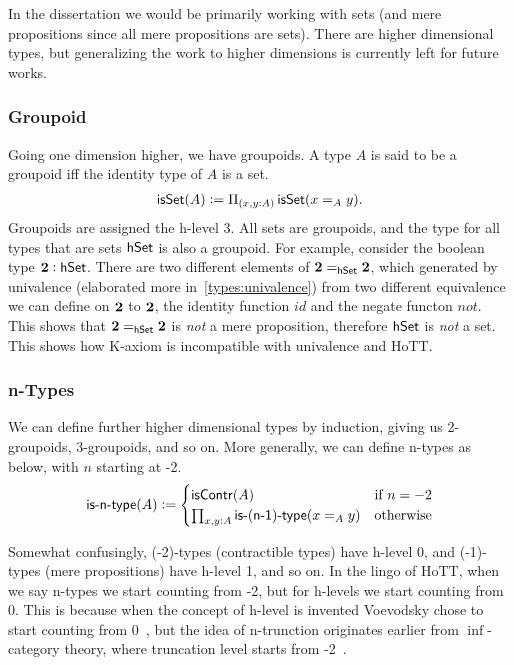 In the dissertation we would be primarily working with sets
(and mere propositions since all mere propositions are sets).
There are higher dimensional types, but generalizing the work to
higher dimensions is currently left for future works.

\subsubsection{Groupoid}
Going one dimension higher, we have groupoids. A type $A$ is said to be a
groupoid iff the identity type of $A$ is a set.
\begin{align*}
    \operatorname{\mathsf{isSet}}(A) := \Pi_{(x,y : A)}\operatorname{\mathsf{isSet}}(x =_A y).
\end{align*}
Groupoids are assigned the h-level 3. All sets are groupoids,
and the type for all types that are sets $\mathsf{hSet}$ is also a groupoid.
For example, consider the boolean type ${\mathbf{2}} : \mathsf{hSet}$. There are two
different elements of ${\mathbf{2}} =_{\mathsf{hSet}} {\mathbf{2}}$, which generated by
univalence (elaborated more in~\cref{types:univalence}) from two
different equivalence we can define on ${\mathbf{2}}$ to ${\mathbf{2}}$, the
identity function $id$ and the negate functon $not$.
This shows that ${\mathbf{2}} =_{\mathsf{hSet}} {\mathbf{2}}$ is \emph{not} a mere proposition,
therefore $\mathsf{hSet}$ is \emph{not} a set. This shows how K-axiom is
incompatible with univalence and HoTT.

\subsubsection{n-Types}
We can define further higher dimensional types by induction, giving us
2-groupoids, 3-groupoids, and so on. More generally, we can define
n-types as below, with $n$ starting at -2.
\begin{align*}
    \operatorname{\mathsf{is-n-type}}(A) := \begin{cases}
        \operatorname{\mathsf{isContr}}(A) & \text{if $n = -2$} \\
        \prod_{x, y : A}\operatorname{\mathsf{is-(n-1)-type}}(x =_A y) & \text{otherwise}
    \end{cases}
\end{align*}

Somewhat confusingly, (-2)-types (contractible types) have h-level 0,
and (-1)-types (mere propositions) have h-level 1, and so on.
In the lingo of HoTT, when we say n-types we start counting from -2,
but for h-levels we start counting from 0. This is because when
the concept of h-level is invented Voevodsky chose to start counting
from 0~\cite{voevodsky_univalent_2010},
but the idea of n-trunction originates earlier from $\inf$-category theory,
where truncation level starts from -2~\cite{lurie_higher_2008}.

